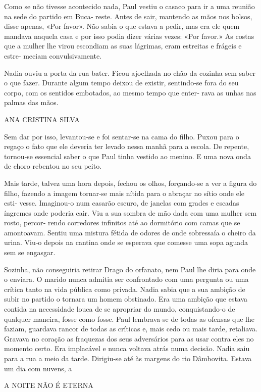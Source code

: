 Como se não tivesse acontecido nada, Paul vestiu o casaco para ir a uma
reunião na sede do partido em Buca‑ reste. Antes de sair, mantendo as
mãos nos bolsos, disse apenas, «Por favor». Não sabia o que estava a
pedir, mas era ele quem mandava naquela casa e por isso podia dizer
várias vezes: «Por favor.» As costas que a mulher lhe virou escondiam as
suas lágrimas, eram estreitas e frágeis e estre‑ meciam convulsivamente.

Nadia ouviu a porta da rua bater. Ficou ajoelhada no chão da cozinha sem
saber o que fazer. Durante algum tempo deixou de existir, sentindo‑se
fora do seu corpo, com os sentidos embotados, ao mesmo tempo que enter‑
rava as unhas nas palmas das mãos.

ANA CRISTINA SILVA

Sem dar por isso, levantou‑se e foi sentar‑se na cama do filho. Puxou
para o regaço o fato que ele deveria ter levado nessa manhã para a
escola. De repente, tornou‑se essencial saber o que Paul tinha vestido
ao menino. E uma nova onda de choro rebentou no seu peito.

Mais tarde, talvez uma hora depois, fechou os olhos, forçando‑se a ver a
figura do filho, fazendo a imagem tornar‑se mais nítida para o abraçar
no sítio onde ele esti‑ vesse. Imaginou‑o num casarão escuro, de janelas
com grades e escadas íngremes onde poderia cair. Viu a sua sombra de mão
dada com uma mulher sem rosto, percor‑ rendo corredores infinitos até ao
dormitório com camas que se amontoavam. Sentiu uma mistura fétida de
odores de onde sobressaía o cheiro da urina. Viu‑o depois na cantina
onde se esperava que comesse uma sopa aguada sem se engasgar.

Sozinha, não conseguiria retirar Drago do orfanato, nem Paul lhe diria
para onde o enviara. O marido nunca admitia ser confrontado com uma
pergunta ou uma crítica tanto na vida pública como privada. Nadia sabia
que a sua ambição de subir no partido o tornara um homem obstinado. Era
uma ambição que estava contida na necessidade louca de se apropriar do
mundo, conquistando‑o de qualquer maneira, fosse como fosse. Paul
lembrava‑se de todas as ofensas que lhe faziam, guardava rancor de todas
as críticas e, mais cedo ou mais tarde, retaliava. Gravava no coração as
fraquezas dos seus adversários para as usar contra eles no momento
certo. Era implacável e nunca voltava atrás numa decisão. Nadia saiu
para a rua a meio da tarde. Dirigiu‑se até às margens do rio Dâmbovita.
Estava um dia com nuvens, a

A NOITE NÃO É ETERNA

